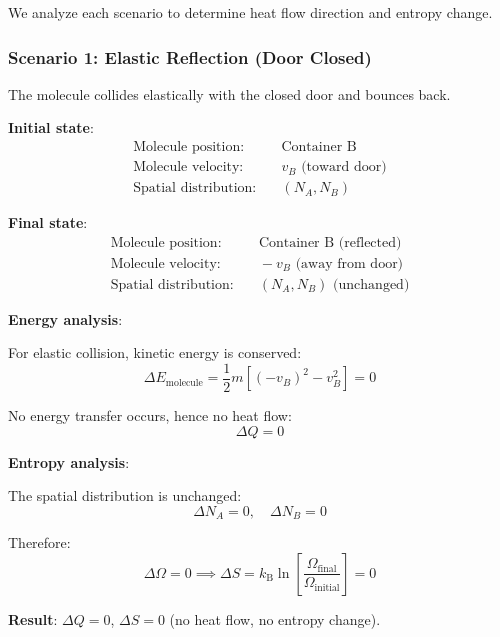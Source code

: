 \documentclass[10pt,twocolumn,letterpaper]{article}
\theoremstyle{definition}
\theoremstyle{remark}
\newcommand{\kb}{k_\text{B}}
\newcommand{\Om}{\Omega}
\begin{document}
We analyze each scenario to determine heat flow direction and entropy change.

\subsubsection{Scenario 1: Elastic Reflection (Door Closed)}

The molecule collides elastically with the closed door and bounces back.

\textbf{Initial state}:
\begin{align}
\text{Molecule position:} &\quad \text{Container B} \\
\text{Molecule velocity:} &\quad v_B \text{ (toward door)} \\
\text{Spatial distribution:} &\quad (N_A, N_B)
\end{align}

\textbf{Final state}:
\begin{align}
\text{Molecule position:} &\quad \text{Container B (reflected)} \\
\text{Molecule velocity:} &\quad -v_B \text{ (away from door)} \\
\text{Spatial distribution:} &\quad (N_A, N_B) \text{ (unchanged)}
\end{align}

\textbf{Energy analysis}:

For elastic collision, kinetic energy is conserved:
\begin{equation}
\Delta E_{\text{molecule}} = \frac{1}{2}m[(-v_B)^2 - v_B^2] = 0
\end{equation}

No energy transfer occurs, hence no heat flow:
\begin{equation}
\Delta Q = 0
\end{equation}

\textbf{Entropy analysis}:

The spatial distribution is unchanged:
\begin{equation}
\Delta N_A = 0, \quad \Delta N_B = 0
\end{equation}

Therefore:
\begin{equation}
\Delta \Om = 0 \implies \Delta S = \kb \ln\left[\frac{\Om_{\text{final}}}{\Om_{\text{initial}}}\right] = 0
\end{equation}

\textbf{Result}: $\Delta Q = 0$, $\Delta S = 0$ (no heat flow, no entropy change).
\end{document}
